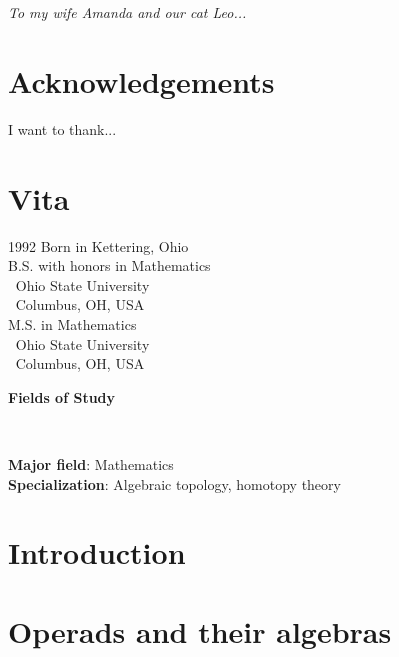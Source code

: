\documentclass[11pt, twoside]{report}
\theoremstyle{definition}
\theoremstyle{remark}
\begin{document}
\chapter*{}
\begin{center} 
\textit{To my wife Amanda and our cat Leo...}
\end{center}
\chapter*{Acknowledgements}
I want to thank...


\chapter*{Vita}
 
1992 \dotfill Born in Kettering, Ohio\\

 \dotfill B.S. with honors in Mathematics\\
 $~$ \hfill Ohio State University\\
 $~$ \hfill Columbus, OH, USA\\
 
 \dotfill M.S. in Mathematics\\
 $~$ \hfill Ohio State University\\
 $~$ \hfill Columbus, OH, USA\\

\begin{center}
    \huge \textbf{Fields of Study}
\end{center}
$~$\newline 

\noindent \textbf{Major field}: Mathematics \\
\noindent \textbf{Specialization}: Algebraic topology, homotopy theory
\endgroup %
 

\tableofcontents



\chapter{Introduction}
\setcounter{page}{1}



\chapter{Operads and their algebras}

\end{document}
